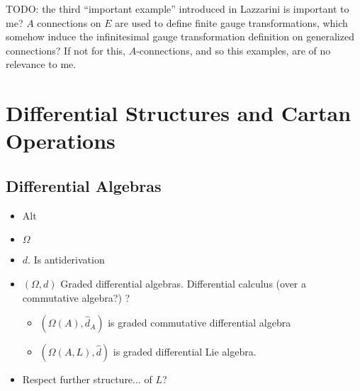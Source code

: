 TODO: the third ``important example'' introduced in Lazzarini is important to me? $A$ connections on $E$ are used to define finite gauge transformations, which somehow induce the infinitesimal gauge transformation definition on generalized connections? If not for this, $A$-connections, and so this examples, are of no relevance to me.

\section{Differential Structures and Cartan Operations}

\subsection{Differential Algebras}

\begin{itemize}

\item Alt

\item $\Omega$

\item $d$. Is antiderivation

\item $(\Omega, d)$ Graded differential algebras. Differential calculus (over a commutative algebra?) ?
    
    \begin{itemize}
    
    \item $(\Omega(A), \hat d_A)$ is graded commutative differential algebra
    
    \item $(\Omega(A, L), \hat d)$ is graded differential Lie algebra.
    
    \end{itemize}

\item Respect further structure... of $L$?

\end{itemize}

